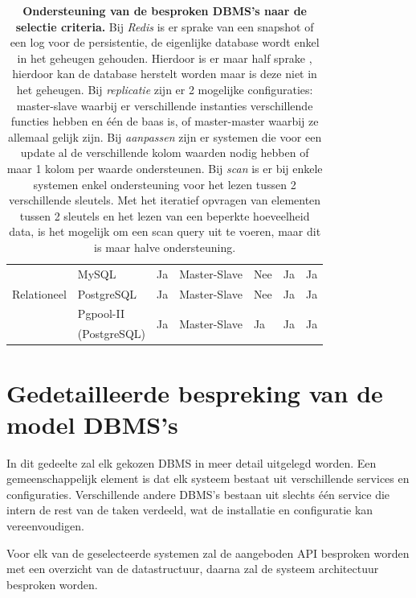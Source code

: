 \begin{table}[htbp]
{\begin{tabular}{ll|lllll}
          \hline
    \multirow{3}[0]{*}{Relationeel} & MySQL & Ja    & Master-Slave & Nee   & Ja    & Ja \\
    	  & PostgreSQL & Ja    & Master-Slave & Nee   & Ja    & Ja \\
          & Pgpool-II & \multicolumn{1}{l}{\multirow{2}[0]{*}{Ja}} & \multicolumn{1}{l}{\multirow{2}[0]{*}{Master-Slave}} & \multicolumn{1}{l}{\multirow{2}[0]{*}{Ja}} & \multicolumn{1}{l}{\multirow{2}[0]{*}{Ja}} & \multicolumn{1}{l}{\multirow{2}[0]{*}{Ja}} \\
          & (PostgreSQL) & \multicolumn{1}{l}{} & \multicolumn{1}{l}{} & \multicolumn{1}{l}{} & \multicolumn{1}{l}{} & \multicolumn{1}{l}{} \\
    \end{tabular}%
    }
    \caption{\textbf{Ondersteuning van de besproken DBMS's naar de selectie criteria. \newline}
    Bij \textit{Redis} is er sprake van een snapshot of een log voor de persistentie, de eigenlijke database wordt enkel in het geheugen gehouden. Hierdoor is er maar half sprake , hierdoor kan de database herstelt worden maar is deze niet in het geheugen.  Bij \textit{replicatie} zijn er 2 mogelijke configuraties: master-slave waarbij er verschillende instanties verschillende functies hebben en één de baas is, of master-master waarbij ze allemaal gelijk zijn.
    Bij \textit{aanpassen} zijn er systemen die voor een update al de verschillende kolom waarden nodig hebben of maar 1 kolom per waarde ondersteunen.
    Bij \textit{scan} is er bij enkele systemen enkel ondersteuning voor het lezen tussen 2 verschillende sleutels. Met het iteratief opvragen van elementen tussen 2 sleutels en het lezen van een beperkte hoeveelheid data, is het mogelijk om een scan query uit te voeren, maar dit is maar halve ondersteuning. }
  \label{table:vergelijkingNosql}%
\end{table}%

\section{Gedetailleerde bespreking van de model DBMS's}
In dit gedeelte zal elk gekozen DBMS in meer detail uitgelegd worden. Een gemeenschappelijk element is dat elk systeem bestaat uit verschillende services en configuraties. Verschillende andere DBMS's bestaan uit slechts één service die intern de rest van de taken verdeeld, wat de installatie en configuratie kan vereenvoudigen. 

Voor elk van de geselecteerde systemen zal de aangeboden API besproken worden met een overzicht van de datastructuur, daarna zal de systeem architectuur besproken worden. 

